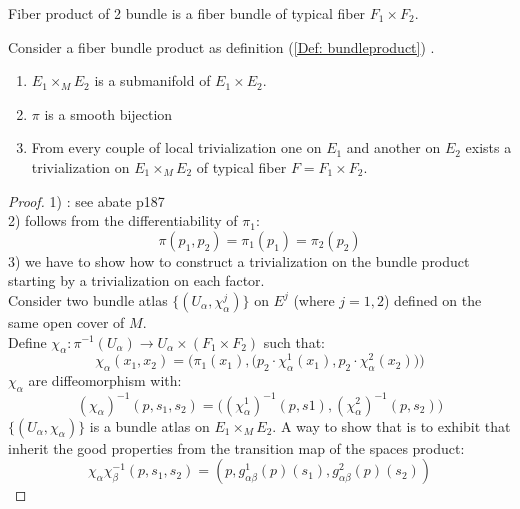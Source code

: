 \documentclass[a4paper,12pt]{scrartcl}    %
\begin{document}
\begin{theorem}
Fiber product of 2 bundle is a fiber bundle of typical fiber $F_1\times F_2$.
	\begin{hypothesis}
		Consider a fiber bundle product as definition (\ref{Def: bundleproduct}) .
	\end{hypothesis}
	\begin{thesis}
	\begin{enumerate}
	\item $E_1 \times_M E_2$ is a submanifold of $E_1 \times E_2 $.
	\item $\pi$ is a smooth bijection
	\item From every couple of local trivialization one on $E_1$ and another on $E_2$ exists a trivialization on  $E_1 \times_M E_2$ of typical fiber $F = F_1 \times F_2$.
	\end{enumerate}
	\end{thesis}
\end{theorem}
\begin{proof}
1) : see abate p187
\\
2) follows from the differentiability of $\pi_1$: 
\begin{displaymath}
\pi (p_1, p_2) = \pi_1 (p_1) = \pi_2 (p_2)
\end{displaymath}
3) we have to show how to construct a trivialization on the bundle product starting by a trivialization on each factor.
\\
Consider two bundle atlas $\{ ( U_\alpha , \chi_\alpha^j ) \}$ on $E^j$ (where $j=1,2$) defined on the same open cover of $M$.
\\
Define $\chi_\alpha : \pi^{-1} (U_\alpha) \rightarrow U_\alpha \times ( F_1 \times F_2)$ such that:
\begin{displaymath}
\chi_\alpha (x_1, x_2) = \Big( \pi_1 (x_1),\big( p_2 \cdot \chi_\alpha^1(x_1) , p_2 \cdot \chi_\alpha^2(x_2) \big)  \Big)
\end{displaymath}
$\chi_\alpha$ are diffeomorphism with:
\begin{displaymath}
(\chi_\alpha)^{-1} ( p, s_1, s_2) = \big( (\chi_\alpha^1)^{-1}(p,s1), (\chi_{\alpha}^2)^{-1} ( p, s_2) \big)
\end{displaymath}
$\{ (U_\alpha , \chi_\alpha ) \}$ is a bundle atlas on $E_1 \times_M E_2$. A way to show that is to exhibit that inherit the good properties from the transition map of the spaces product:
\begin{displaymath}
\chi_\alpha \chi_\beta ^{-1} ( p, s_1, s_2) = ( p, g^1_{\alpha\beta}(p)(s_1), g^2_{\alpha \beta}(p) (s_2))
\end{displaymath}
\end{proof}
\end{document}
